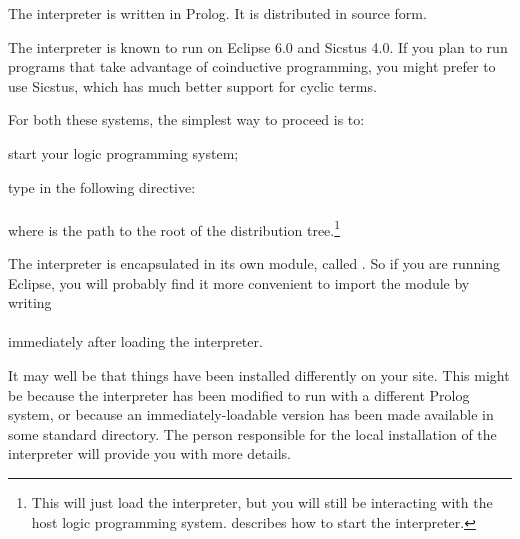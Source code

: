 

%

The interpreter is written in Prolog.  It is distributed in source
form.%

The interpreter is known to run on Eclipse 6.0 and Sicstus 4.0.  If you plan
to run programs that take advantage of coinductive programming, you might
prefer to use Sicstus, which has much better support for cyclic terms.

For both these systems, the simplest way to proceed is to:
\begin{Enumerate}
\item
  start your logic programming system;
\item
  type in the following directive:\\
  \ind{}\\
  where  is the path to the root of the distribution
  tree.\footnote{
    This will just load the interpreter, but you will still be interacting
    with the host logic programming system.  
    describes how to start the interpreter.}
\end{Enumerate}

The interpreter is encapsulated in its own module, called .  So if
you are running Eclipse, you will probably find it more convenient to import
the module by writing\\
\ind{}\label{import-dra}\\
immediately after loading the interpreter.

It may well be that things have been installed differently on your site.
This might be because the interpreter has been modified to run with a
different Prolog system, or because an immediately-loadable version has been
made available in some standard directory. The person responsible for the
local installation of the interpreter will provide you with more details.


%

